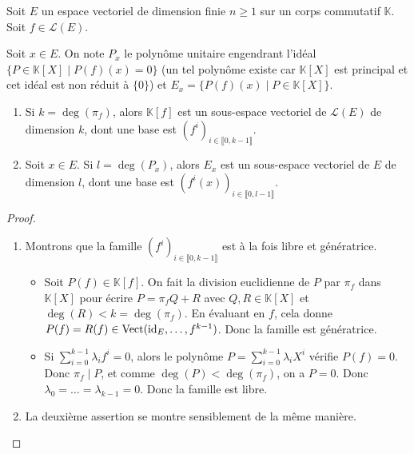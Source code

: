 






  Soit $E$ un espace vectoriel de dimension finie $n \geq 1$ sur un corps commutatif $\mathbb{K}$. Soit $f \in \mathcal{L}(E)$.

  \begin{notation}
    Soit $x \in E$. On note $P_x$ le polynôme unitaire engendrant l'idéal $\{ P \in \mathbb{K}[X] \mid P(f)(x) = 0 \}$ (un tel polynôme existe car $\mathbb{K}[X]$ est principal et cet idéal est non réduit à $\{ 0 \}$) et $E_x = \{ P(f)(x) \mid P \in \mathbb{K}[X] \}$.
  \end{notation}

  \begin{lemma}
    \label{invariants-de-similitude-1}
    \begin{enumerate}[label=(\roman*)]
      \item Si $k = \deg(\pi_f)$, alors $\mathbb{K}[f]$ est un sous-espace vectoriel de $\mathcal{L}(E)$ de dimension $k$, dont une base est $(f^i)_{i \in \llbracket 0, k-1 \rrbracket}$.
      \item Soit $x \in E$. Si $l = \deg(P_x)$, alors $E_x$ est un sous-espace vectoriel de $E$ de dimension $l$, dont une base est $(f^i(x))_{i \in \llbracket 0, l-1 \rrbracket}$.
    \end{enumerate}
  \end{lemma}


  \begin{proof}
    \begin{enumerate}[label=(\roman*)]
      \item Montrons que la famille $(f^i)_{i \in \llbracket 0, k-1 \rrbracket}$ est à la fois libre et génératrice.
      \begin{itemize}
        \item Soit $P(f) \in \mathbb{K}[f]$. On fait la division euclidienne de $P$ par $\pi_f$ dans $\mathbb{K}[X]$ pour écrire $P = \pi_f Q + R$ avec $Q, R \in \mathbb{K}[X]$ et $\deg(R) < k = \deg(\pi_f)$. En évaluant en $f$, cela donne $P(f) = R(f) \in \operatorname{Vect}(\operatorname{id}_E, \dots, f^{k-1})$. Donc la famille est génératrice.
        \item Si $\sum_{i=0}^{k-1} \lambda_i f^i = 0$, alors le polynôme $P = \sum_{i=0}^{k-1} \lambda_i X^i$ vérifie $P(f) = 0$. Donc $\pi_f \mid P$, et comme $\deg(P) < \deg(\pi_f)$, on a $P = 0$. Donc $\lambda_0 = \dots = \lambda_{k-1} = 0$. Donc la famille est libre.
      \end{itemize}
      \item La deuxième assertion se montre sensiblement de la même manière.
    \end{enumerate}
  \end{proof}

